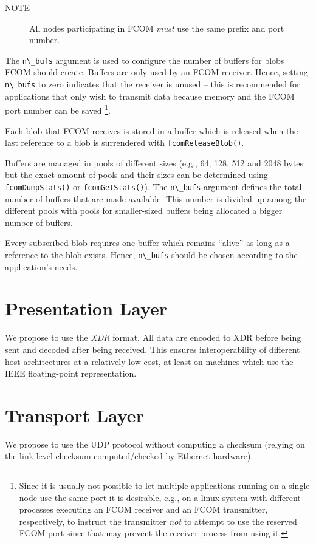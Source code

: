 \documentclass[11pt]{article}
\newcommand{\fcom}{FCOM}
\newcommand{\blob}{blob}
\newcommand{\cstl}[1]{{\lstinline+#1+}}
\newcommand{\note}[1]{
	\begin{description}
		\item[NOTE] #1
	\end{description}
}
\begin{document}
      \note{All nodes participating in \fcom{} {\em must} use the
      same prefix and port number.}

      The \cstl{n\_bufs} argument is used to configure the
      number of buffers for \blob{}s \fcom{} should create.
      Buffers are only used by an \fcom{} receiver. Hence,
      setting \cstl{n\_bufs} to zero indicates that the
      receiver is unused -- this is recommended for applications
      that only wish to transmit data because memory and
      the \fcom{} port number can be saved%
\footnote{Since it is usually not possible to let multiple
applications running on a single node use the same port it
is desirable, e.g., on a linux system with different
processes executing an \fcom{} receiver and an \fcom{}
transmitter, respectively, to instruct the transmitter
{\em not} to attempt to use the reserved \fcom{} port since
that may prevent the receiver process from using it.}.

      Each \blob{} that \fcom{} receives is stored in
	  a buffer which is released when the last reference
      to a \blob{} is surrendered with \cstl{fcomReleaseBlob()}.

      Buffers are managed in pools of different sizes
      (e.g., 64, 128, 512 and 2048 bytes but the exact
      amount of pools and their sizes can be determined
      using \cstl{fcomDumpStats()} or \cstl{fcomGetStats()}).
      The \cstl{n\_bufs} argument defines the total
      number of buffers that are made available. This
      number is divided up among the different pools with
      pools for smaller-sized buffers being allocated a
      bigger number of buffers.

      Every subscribed \blob{} requires one buffer
      which remains ``alive'' as long as a reference
      to the \blob{} exists. Hence, \cstl{n\_bufs}
      should be chosen according to the application's
      needs.
     
\section{Presentation Layer}
We propose to use the {\em XDR} format. All data are encoded
to XDR before being sent and decoded after being received.
This ensures interoperability of different host architectures
at a relatively low cost, at least on machines which use the
IEEE floating-point representation.

\section{Transport Layer}
We propose to use the UDP protocol without computing a checksum
(relying on the link-level checksum computed/checked by Ethernet hardware).
\end{document}
